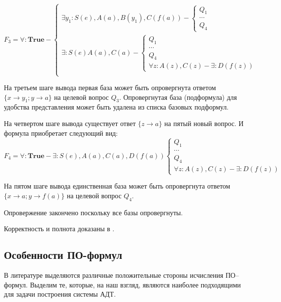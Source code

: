 \begin{example}
\begin{equation*}\label{ex:f3}
F_3 =
\forall:\boldsymbol{True} -
\left\lbrace
\begin{array}{l}
	\exists y_1\colon S(e),A(a),B(y_1),C(f(a)) -
	\left\lbrace
	\begin{array}{l}
		Q_1 \\ \cdots \\ Q_4
	\end{array}\right. \\
	\exists\colon S(e)A(a),C(a) -
	\left\lbrace
	\begin{array}{l}
		Q_1 \\ \cdots \\ Q_4 \\
		\forall z\colon A(z),C(z) - \exists\colon D(f(z))
	\end{array}\right. \\
\end{array}\right.
\end{equation*}

На третьем шаге вывода первая база может быть опровергнута ответом $\{x \rightarrow y_1; y \rightarrow a\}$ на целевой вопрос $Q_3$. Опровергнутая база (подформула) для удобства представления может быть удалена из списка базовых подформул.

На четвертом шаге вывода существует ответ $\{z \rightarrow a\}$ на пятый новый вопрос. И формула приобретает следующий вид:
\begin{equation*}\label{ex:f5}
	F_4 = \forall\colon\boldsymbol{True} - \exists\colon S(e),A(a), C(a),D(f(a))
	\left\lbrace
	\begin{array}{l}
		Q_1 \\ \cdots \\ Q_4 \\
		\forall z\colon A(z),C(z) - \exists\colon D(f(z))
	\end{array}\right.
\end{equation*}

На пятом шаге вывода единственная база может быть опровергнута ответом $\{x \rightarrow a; y \rightarrow f(a)\}$ на целевой вопрос $Q_4$.

Опровержение закончено поскольку все базы опровергнуты.

\end{example}

Корректность и полнота доказаны в \cite{}.

\subsection{Особенности ПО-формул}
В литературе выделяются различные положительные стороны исчисления ПО--формул. Выделим те, которые, на наш взгляд, являются наиболее подходящими для задачи построения системы АДТ.

